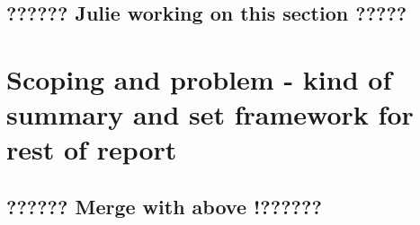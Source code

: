 \documentclass{report}
\begin{document}
\subsection{?????? Julie working on this section ?????}

% 
% 
% 

\section{Scoping and problem - kind of summary and set framework for rest of report}

\subsection{??????  Merge with above !?????? }
\end{document}
